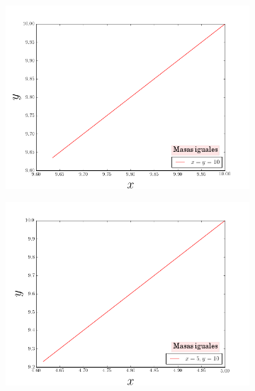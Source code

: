 \documentclass[a4paper,10pt]{article}
\numberwithin{equation}{section}
\begin{document}
\begin{multicols}{2}
\begin{figure}[H]
\begin{subfigure}{.4\textwidth}
\centering
\includegraphics[scale=0.3]{problema1fig2}
\label{fig:problema1fig2}
\end{subfigure}

\begin{subfigure}{.4\textwidth}
\centering
\includegraphics[scale=0.3]{problema1fig3}
\label{fig:problema1fig3}
\end{subfigure}
\end{figure}


\end{multicols}
\end{document}
